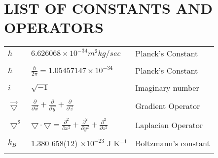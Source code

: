 \chapter*{LIST OF CONSTANTS AND OPERATORS}

\begin{tabular}{p{1.2in}p{2.5in}p{2.5in}}

$h$ & $6.626068 \times 10 ^ {-34} m^2kg/sec$ & Planck's Constant \\ \\

$\hbar$ & $\frac h {2 \pi} = 1.05457147 \times 10 ^ {-34}$ & 
          Planck's Constant \\ \\

$i$ & $\sqrt{-1}$ & Imaginary number \\ \\

$\vec{\bigtriangledown}$ & $\frac{\partial}{\partial \vec{x}} +
\frac{\partial}{\partial \vec{y}} + \frac {\partial}{\partial \vec{z}}$ &
Gradient Operator \\ \\

$\bigtriangledown^2$ & $\bigtriangledown \cdot \bigtriangledown = \frac
{\partial ^2} {\partial x ^2} + \frac {\partial ^2} {\partial y^2} + \frac
{\partial ^2} {\partial z ^2}$ & Laplacian Operator \\ \\

$k_B$ & 1.380 658(12) $\times 10 ^ {-23}$ J K$^{-1}$ &
Boltzmann's constant \cite{CRC_Book} \\ \\

\end{tabular}
